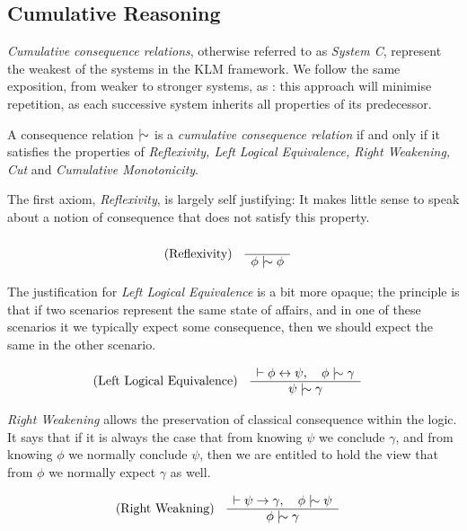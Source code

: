 \subsection{Cumulative Reasoning}
\label{subsection:system-c} 

\textit{Cumulative consequence relations}, otherwise referred to as \textit{System C}, represent the weakest of the systems
in the KLM framework. We follow the same exposition, from weaker to stronger systems, as \cite{kraus1990nonmonotonic}: this
approach will minimise repetition, as each successive system inherits all properties of its predecessor.

\begin{definition}
	\label{definition:cumulative-consequence-relation} A consequence relation $\twiddle$ is a \emph{cumulative consequence
	relation} if and only if it satisfies the properties of \emph{Reflexivity, Left Logical Equivalence, Right Weakening, Cut}
	and \emph{Cumulative Monotonicity}.
\end{definition}

The first axiom, \textit{Reflexivity}, is largely self justifying: It makes little sense to speak about a notion of consequence
that does not satisfy this property.

\begin{align}
	\label{postulate:ref}\inferLeft{Reflexivity}{}{\phi \twiddle \phi}
\end{align}

The justification for \textit{Left Logical Equivalence} is a bit more opaque; the principle is that if two scenarios
represent the same state of affairs, and in one of these scenarios it we typically expect some consequence, then we
should expect the same in the other scenario.

\begin{align}
	\label{postulate:lle}\inferLeft{Left Logical Equivalence}{\vdash \phi \leftrightarrow \psi, \quad \phi \twiddle \gamma}{\psi \twiddle \gamma}
\end{align}

\textit{Right Weakening} allows the preservation of classical consequence within the logic. It says that if it is always
the case that from knowing $\psi$ we conclude $\gamma$, and from knowing $\phi$ we normally conclude $\psi$, then we are
entitled to hold the view that from $\phi$ we normally expect $\gamma$ as well.

\begin{align}
	\label{postulate:rw}\inferLeft{Right Weakning}{\vdash \psi \rightarrow \gamma, \quad \phi \twiddle \psi}{\phi \twiddle \gamma}
\end{align}

